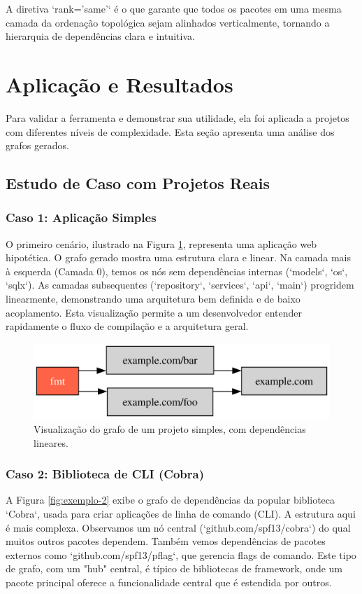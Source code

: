 \documentclass[12pt]{article}
\begin{document}
A diretiva `rank='same'` é o que garante que todos os pacotes em uma mesma camada da ordenação topológica sejam alinhados verticalmente, tornando a hierarquia de dependências clara e intuitiva.

\section{Aplicação e Resultados}
Para validar a ferramenta e demonstrar sua utilidade, ela foi aplicada a projetos com diferentes níveis de complexidade. Esta seção apresenta uma análise dos grafos gerados.

\subsection{Estudo de Caso com Projetos Reais}

\subsubsection{Caso 1: Aplicação Simples}
O primeiro cenário, ilustrado na Figura \ref{fig:grafoExemplo}, representa uma aplicação web hipotética. O grafo gerado mostra uma estrutura clara e linear. Na camada mais à esquerda (Camada 0), temos os nós sem dependências internas (`models`, `os`, `sqlx`). As camadas subsequentes (`repository`, `services`, `api`, `main`) progridem linearmente, demonstrando uma arquitetura bem definida e de baixo acoplamento. Esta visualização permite a um desenvolvedor entender rapidamente o fluxo de compilação e a arquitetura geral.

\begin{figure}[htbp]
\centering
\includegraphics[width=.75\textwidth]{examples/example.com.png}
\caption{Visualização do grafo de um projeto simples, com dependências lineares.}
\label{fig:grafoExemplo}
\end{figure}

\subsubsection{Caso 2: Biblioteca de CLI (Cobra)}
A Figura \ref{fig:exemplo-2} exibe o grafo de dependências da popular biblioteca `Cobra`, usada para criar aplicações de linha de comando (CLI). A estrutura aqui é mais complexa. Observamos um nó central (`github.com/spf13/cobra`) do qual muitos outros pacotes dependem. Também vemos dependências de pacotes externos como `github.com/spf13/pflag`, que gerencia flags de comando. Este tipo de grafo, com um "hub" central, é típico de bibliotecas de framework, onde um pacote principal oferece a funcionalidade central que é estendida por outros.
\end{document}
